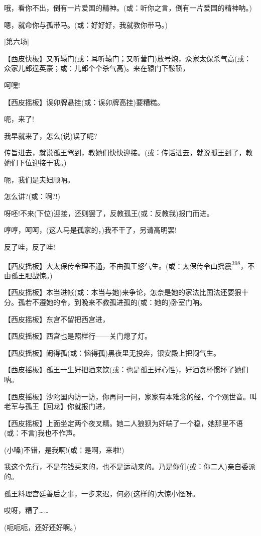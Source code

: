 哦，看你不出，倒有一片爱国的精神。(或：听你之言，倒有一片爱国的精神呐。)

嗯，就命你与孤带马。(或：好好好，我就教你带马。)

{[}第六场{]}

【西皮快板】又听辕门(或：耳听辕门；又听营门)放号炮，众家太保杀气高(或：众家儿郎逞英豪；或：儿郎个个杀气高)。来在辕门下鞍鞒，

呵嘿!

【西皮摇板】误卯牌悬挂(或：误卯牌高挂)要糟糕。

呃，来了!

我早就来了，怎么(说)误了呢?

传旨进去，就说孤王驾到，教她们快快迎接。(或：传话进去，就说孤王到了，教她们下位迎接于我。)

呃，我们是夫妇顺呐。

怎么讲?(或：啊?!)

呀呸!不来(下位)迎接，还则罢了，反教孤王(或：反教我)报门而进。

哼哼，呵呵，(这人马是孤家的，)我不干了，另请高明罢!

反了哇，反了哇!

【西皮摇板】大太保传令理不通，不由孤王怒气生。(或：太保传令山摇震\protect\hyperlink{fn398}{\textsuperscript{398}}，不由孤王胆战惊。)

【西皮摇板】本当进帐(或：本当与她)来争论，怎奈是她的家法比国法还要狠十分。孤若不遵她的令，到晚来不教孤进孤的(或：她的)卧室门呐。

【西皮摇板】东宫不留把西宫进，

【西皮摇板】西宫也是照样行------关门熄了灯。

【西皮摇板】闹得孤(或：恼得孤)黑夜里无投奔，银安殿上把闷气生。

【西皮摇板】孤王一生好把酒来饮(或：也是孤王好心性)，好酒贪杯惯坏了她们呐。

【西皮摇板】沙陀国内访一访，你再问一问，家家有本难念的经，个个观世音。叫老军与孤王【回龙】你就报门进，

【西皮摇板】上面坐定两个夜叉精。她二人狼狈为奸端了一个稳，她那里不语(或：不言)我也不作声。

(小嗓)不错，是我啊!(或：是啊，来啦!)

我这个先行，不是花钱买来的，也不是运动来的。乃是你们(或：你二人)亲自委派的。

孤王料理宫廷善后之事，一步来迟，何必(这样的)大惊小怪呀。

哎呀，糟了\ldots{}\ldots{}

(呃呃呃，还好还好啊。)

